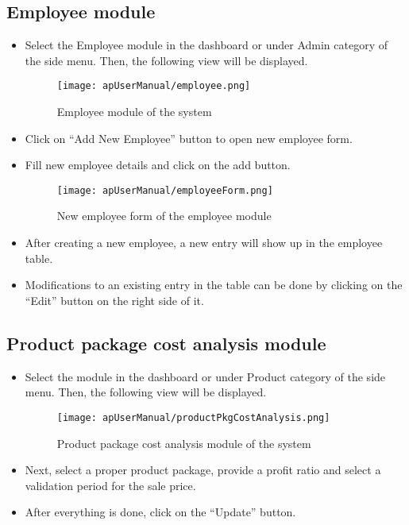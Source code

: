 \documentclass[12pt]{report}
\begin{document}
\subsection{Employee module}
\begin{itemize}
	\item Select the Employee module in the dashboard or under Admin category of the side menu. Then, the following view will be displayed.
	      \begin{figure}[H]
		      \centering
		      \texttt{[image: apUserManual/employee.png]}
		      \caption{Employee module of the system}
	      \end{figure}

	\item Click on ``Add New Employee'' button to open new employee form.

	\item Fill new employee details and click on the add button.
	      \begin{figure}[H]
		      \centering
		      \texttt{[image: apUserManual/employeeForm.png]}
		      \caption{New employee form of the employee module}
	      \end{figure}

	\item After creating a new employee, a new entry will show up in the employee table.

	\item Modifications to an existing entry in the table can be done by clicking on the ``Edit'' button on the right side of it.

\end{itemize}

\subsection{Product package cost analysis module}

\begin{itemize}
	\item Select the module in the dashboard or under Product category of the side menu. Then, the following view will be displayed.
	      \begin{figure}[H]
		      \centering
		      \texttt{[image: apUserManual/productPkgCostAnalysis.png]}
		      \caption{Product package cost analysis module of the system}
	      \end{figure}

	\item Next, select a proper product package, provide a profit ratio and select a validation period for the sale price.
	\item After everything is done, click on the ``Update'' button.
\end{itemize}
\end{document}
